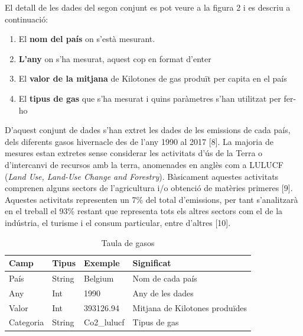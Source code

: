 \documentclass[10pt,a4paper,twocolumn,twoside]{article}
\begin{document}
El detall de les dades del segon conjunt es pot veure a la figura 2 i es descriu a continuació:
\begin{enumerate}
\item El \textbf{nom del país} on s'està mesurant.
\item \textbf{L'any} on s'ha mesurat, aquest cop en format d'enter
\item El \textbf{valor de la mitjana} de Kilotones de gas produït per capita en el país
\item El \textbf{tipus de gas} que s'ha mesurat i quins paràmetres s'han utilitzat per fer-ho
\end{enumerate}

D'aquest conjunt de dades s'han extret les dades de les emissions de cada país, dels diferents gasos hivernacle des de l'any 1990 al 2017 [8]. La majoria de mesures estan extretes sense considerar les activitats d'ús de la Terra o d'intercanvi de recursos amb la terra, anomenades en anglès com a LULUCF (\textit{Land Use, Land-Use Change and Forestry}). Bàsicament aquestes activitats comprenen alguns sectors de l'agricultura i/o obtenció de matèries primeres [9]. Aquestes activitats representen un 7\% del total d'emissions, per tant s'analitzarà en el treball el 93\% restant que representa tots els altres sectors com el de la indústria, el turisme i el consum particular, entre d'altres [10].

\begin{table}[th]
\caption{Taula de gasos}
\begin{center}
\begin{tabular}{  m{1.2cm} | m{0.8cm}| m{1.4cm}| m{2.8cm} }
\hline\hline %
\textbf{Camp} & \textbf{Tipus} & \textbf{Exemple} & \textbf{Significat} \\
\hline
País & String & Belgium & Nom de cada país \\
\hline
Any & Int & 1990 & Any de les dades \\
\hline
Valor & Int & 393126.94 & Mitjana de Kilotones produïdes \\
\hline
Categoria & String & Co2\_lulucf  & Tipus de gas\\
\hline
\hline
\end{tabular}
\end{center}
\end{table}
\end{document}

